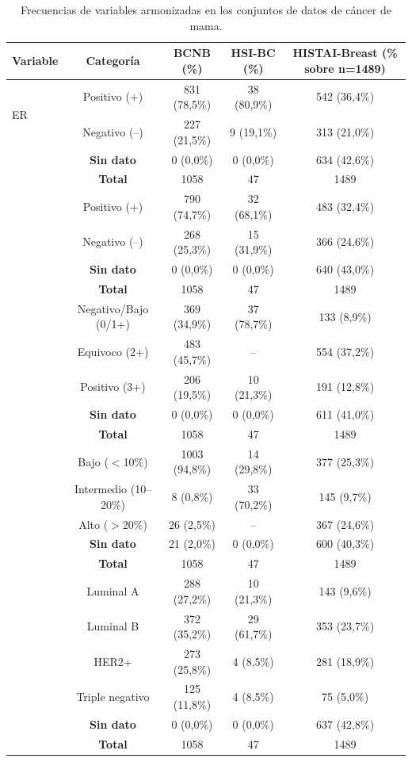 \begin{table}[htbp]
\centering
\caption{Frecuencias de variables armonizadas en los conjuntos de datos de cáncer de mama.}
\label{tab:frecuencias_mama}
\small
\begin{tabular}{lcccc}
\toprule
Variable & Categoría & BCNB (\%) & HSI-BC (\%) & HISTAI-Breast (\% sobre n=1489) \\
\midrule
\multirow{2}{*}{ER}
 & Positivo (+) & 831 (78,5\%) & 38 (80,9\%) & 542  (36,4\%) \\
 & Negativo (--)& 227 (21,5\%) & 9 (19,1\%) & 313  (21,0\%) \\
 & \textbf{Sin dato} & 0 (0,0\%) & 0 (0,0\%) & 634 (42,6\%) \\
 & \textbf{Total} & 1058 & 47 & 1489 \\
\addlinespace
\multirow{2}{*}{PR}
 & Positivo (+) & 790 (74,7\%) & 32 (68,1\%) & 483  (32,4\%) \\
 & Negativo (--)& 268 (25,3\%) & 15 (31,9\%) & 366  (24,6\%) \\
 & \textbf{Sin dato} & 0 (0,0\%) & 0 (0,0\%) & 640 (43,0\%) \\
 & \textbf{Total} & 1058 & 47 & 1489 \\
\addlinespace
\multirow{3}{*}{HER2}
 & Negativo/Bajo (0/1+) & 369 (34,9\%) & 37 (78,7\%) & 133  (8,9\%) \\
 & Equivoco (2+) & 483 (45,7\%) & -- & 554 (37,2\%) \\
 & Positivo (3+) & 206 (19,5\%) & 10 (21,3\%) & 191   (12,8\%) \\
 & \textbf{Sin dato} & 0 (0,0\%) & 0 (0,0\%) & 611 (41,0\%) \\
 & \textbf{Total} & 1058 & 47 & 1489 \\
\addlinespace
\multirow{3}{*}{Ki-67}
 & Bajo ($<$10\%) & 1003 (94,8\%) & 14 (29,8\%) & 377  (25,3\%) \\
 & Intermedio (10--20\%) & 8 (0,8\%) & 33 (70,2\%) & 145  (9,7\%) \\
 & Alto ($>$20\%) & 26 (2,5\%) & -- & 367 (24,6\%) \\
 & \textbf{Sin dato} & 21 (2,0\%) & 0 (0,0\%) & 600 (40,3\%) \\
 & \textbf{Total} & 1058 & 47 & 1489 \\
\addlinespace
\multirow{4}{*}{Subtipo molecular}
 & Luminal A & 288 (27,2\%) & 10 (21,3\%) & 143  (9,6\%) \\
 & Luminal B & 372 (35,2\%) & 29 (61,7\%) & 353  (23,7\%) \\
 & HER2+ & 273 (25,8\%) & 4 (8,5\%) & 281 (18,9\%) \\
 & Triple negativo & 125 (11,8\%) & 4 (8,5\%) & 75  (5,0\%) \\
 & \textbf{Sin dato} & 0 (0,0\%) & 0 (0,0\%) & 637 (42,8\%) \\
 & \textbf{Total} & 1058 & 47 & 1489 \\
\bottomrule
\end{tabular}
\end{table}

